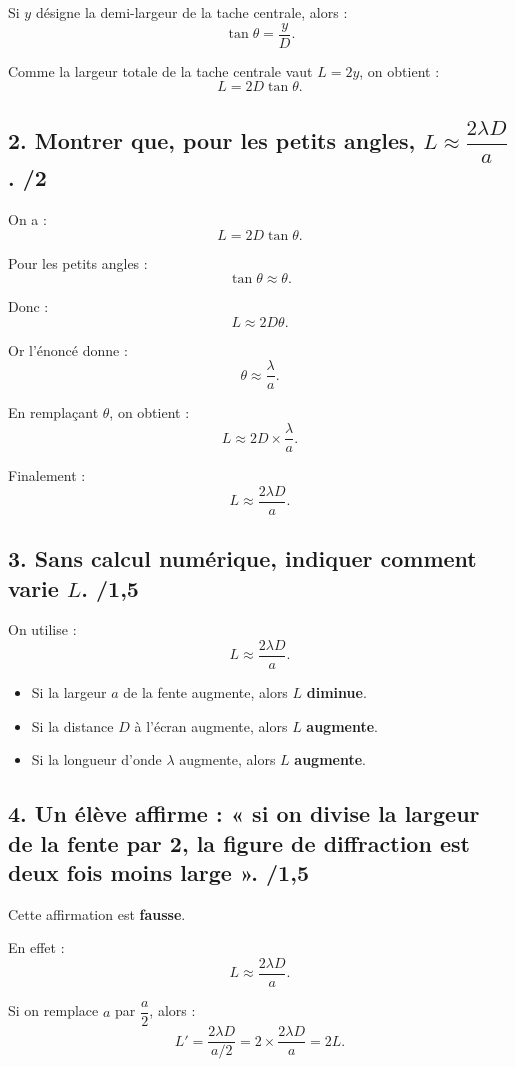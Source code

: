 \documentclass[11pt,a4paper]{article}
\begin{document}
Si \(y\) désigne la demi-largeur de la tache centrale, alors :
\[
\tan \theta = \frac{y}{D}.
\]

Comme la largeur totale de la tache centrale vaut \(L = 2y\), on obtient :
\[
L = 2D \tan \theta.
\]

\subsection*{2. Montrer que, pour les petits angles, \(L \approx \dfrac{2\lambda D}{a}\). \hfill /2}

On a :
\[
L = 2D \tan \theta.
\]

Pour les petits angles :
\[
\tan \theta \approx \theta.
\]

Donc :
\[
L \approx 2D\theta.
\]

Or l'énoncé donne :
\[
\theta \approx \frac{\lambda}{a}.
\]

En remplaçant \(\theta\), on obtient :
\[
L \approx 2D \times \frac{\lambda}{a}.
\]

Finalement :
\[
\boxed{L \approx \frac{2\lambda D}{a}}.
\]

\subsection*{3. Sans calcul numérique, indiquer comment varie \(L\). \hfill /1{,}5}

On utilise :
\[
L \approx \frac{2\lambda D}{a}.
\]

\begin{itemize}
    \item Si la largeur \(a\) de la fente augmente, alors \(L\) \textbf{diminue}.
    \item Si la distance \(D\) à l'écran augmente, alors \(L\) \textbf{augmente}.
    \item Si la longueur d'onde \(\lambda\) augmente, alors \(L\) \textbf{augmente}.
\end{itemize}

\subsection*{4. Un élève affirme : « si on divise la largeur de la fente par 2, la figure de diffraction est deux fois moins large ». \hfill /1{,}5}

Cette affirmation est \textbf{fausse}.

En effet :
\[
L \approx \frac{2\lambda D}{a}.
\]

Si on remplace \(a\) par \(\dfrac{a}{2}\), alors :
\[
L' = \frac{2\lambda D}{a/2} = 2 \times \frac{2\lambda D}{a} = 2L.
\]
\end{document}
